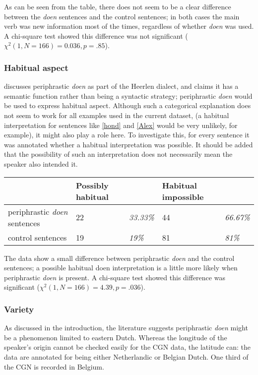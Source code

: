 \documentclass[12pt]{article}
\begin{document}
As can be seen from the table, there does not seem to be a clear difference between the \emph{doen} sentences and the control sentences; in both cases the main verb was new information most of the times, regardless of whether \emph{doen} was used. A chi-square test showed this difference was not significant ($\chi^2(1, N=166) = 0.036, p = .85$).

\subsubsection{Habitual aspect}

\citet{c94} discusses periphrastic \emph{doen} as part of the Heerlen dialect, and claims it has a semantic function rather than being a syntactic strategy; periphrastic \emph{doen} would be used to express habitual aspect. Although such a categorical explanation does not seem to work for all examples used in the current dataset, (a habitual interpretation for sentences like \ref{hond} and \ref{Alex} would be very unlikely, for example), it might also play a role here. To investigate this, for every sentence it was annotated whether a habitual interpretation was possible. It should be added that the possibility of such an interpretation does not necessarily mean the speaker also intended it.

\begin{table}[h] 
\begin{tabular}{|l||ll|ll|} 
\hline
&Possibly habitual&&Habitual impossible&\\
\hline
periphrastic \emph{doen} sentences	&22 	& \emph{33.33\%}	&44		 &\emph{66.67\%}\\
control sentences					&19		& \emph{19\%}		&81		 &\emph{81\%}\\
\hline
\end{tabular}
\end{table}

The data show a small difference between periphrastic \emph{doen} and the control sentences; a possible habitual doen interpretation is a little more likely when periphrastic \emph{doen} is present. A chi-square test showed this difference was significant ($\chi^2(1, N=166) = 4.39, p = .036$).

\subsubsection{Variety}

As discussed in the introduction, the literature suggests periphrastic \emph{doen} might be a phenomenon limited to eastern Dutch. Whereas the longitude of the speaker's origin cannot be checked easily for the CGN data, the latitude can: the data are annotated for being either Netherlandic or Belgian Dutch. One third of the CGN is recorded in Belgium.
\end{document}
